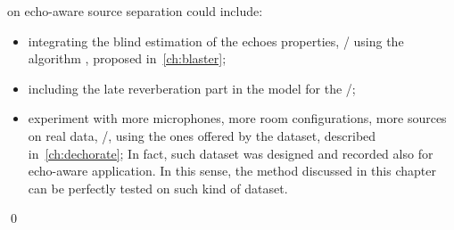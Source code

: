  on echo-aware source separation could include:
\begin{itemize}
    \item integrating the blind estimation of the echoes properties, \eg/ using the algorithm \blaster{}, proposed in~\cref{ch:blaster};
    \item including the late reverberation part in the model for the \RTFs/;
    \item experiment with more microphones, more room configurations, more sources on real data, \eg/, using the ones offered by the \dEchorate{} dataset, described in~\cref{ch:dechorate};
    In fact, such dataset was designed and recorded also for echo-aware application. In this sense, the method discussed in this chapter can be perfectly tested on such kind of dataset.
\end{itemize}
\qed
